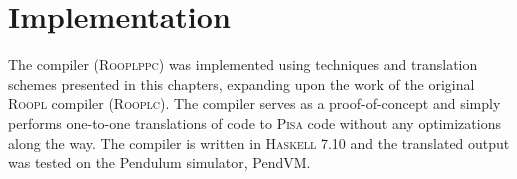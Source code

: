 \section{Implementation}
\label{sec:implementation}
The \rooplpp compiler (\textsc{Rooplppc}) was implemented using techniques and translation schemes presented in this chapters, expanding upon the work of the original \textsc{Roopl} compiler (\textsc{Rooplc}). The compiler serves as a proof-of-concept and simply performs one-to-one translations of \rooplpp code to \textsc{Pisa} code without any optimizations along the way. The compiler is written in \textsc{Haskell} 7.10 and the translated output was tested on the Pendulum simulator, PendVM.



